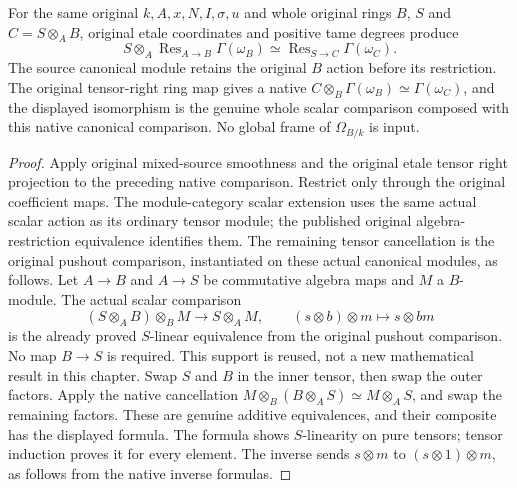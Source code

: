 \begin{lemma}
\label{lem:kn-global-trace-native-mixed-sections}
\leanok
For the same original $k,A,x,N,I,\sigma,u$ and whole original rings
$B$, $S$ and $C=S\otimes_A B$, original etale coordinates and positive
tame degrees produce
\[
 S\otimes_A\operatorname{Res}_{A\to B}\Gamma(\omega_B)
 \simeq\operatorname{Res}_{S\to C}\Gamma(\omega_C).
\]
The source canonical module retains the original $B$ action before its
restriction.  The original tensor-right ring map gives a native
$C\otimes_B\Gamma(\omega_B)\simeq\Gamma(\omega_C)$, and the displayed
isomorphism is the genuine whole scalar comparison composed with this
native canonical comparison.  No global frame of $\Omega_{B/k}$ is input.
\end{lemma}
\begin{proof}
Apply original mixed-source smoothness and the original etale tensor
right projection to the preceding native comparison.  Restrict only
through the original coefficient maps.  The module-category scalar
extension uses the same actual scalar action as its ordinary tensor
module; the published original algebra-restriction equivalence identifies
them.  The remaining tensor cancellation is the original pushout
comparison, instantiated on these actual canonical modules, as follows.
Let $A\to B$ and $A\to S$ be commutative algebra maps and $M$ a
$B$-module.  The actual scalar comparison
\[
 (S\otimes_A B)\otimes_B M\longrightarrow S\otimes_A M,
 \qquad(s\otimes b)\otimes m\longmapsto s\otimes bm
\]
is the already proved $S$-linear equivalence from the original pushout
comparison.  No map $B\to S$ is required.  This support is reused, not
a new mathematical result in this chapter.
Swap $S$ and $B$ in the inner tensor, then swap the outer factors.
Apply the native cancellation $M\otimes_B(B\otimes_A S)\simeq
M\otimes_A S$, and swap the remaining factors.  These are genuine
additive equivalences, and their composite has the displayed formula.
The formula shows $S$-linearity on pure tensors; tensor induction proves
it for every element.  The inverse sends $s\otimes m$ to
$(s\otimes1)\otimes m$, as follows from the native inverse formulas.
\end{proof}

